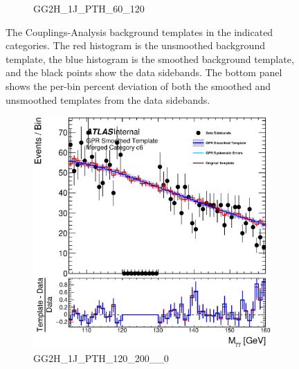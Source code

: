 \begin{figure}
\begin{center}
\begin{subfigure}[T]{0.49\linewidth}
	\caption{GG2H\_1J\_PTH\_60\_120}
\end{subfigure}
\caption{The Couplings-Analysis background templates in the indicated categories. The red histogram is the unsmoothed background template, the blue histogram is the smoothed background template, and the black points show the data sidebands. The bottom panel shows the per-bin percent deviation of both the smoothed and unsmoothed templates from the data sidebands. }
\label{fig:gpr_coupcat_1}
\end{center}
\end{figure}


\begin{figure} 
\begin{center}
\begin{subfigure}[T]{0.49\linewidth}
	\centering
	\includegraphics[width=\linewidth]{figures/background/gpr/coupCatTemplates/GPR_Smoothed_Plot_hmgg_c6.eps}
	\caption{GG2H\_1J\_PTH\_120\_200\_\_0}
\end{subfigure}
\begin{subfigure}[T]{0.49\linewidth}
	\centering

\end{subfigure}
\end{center}
\end{figure}
